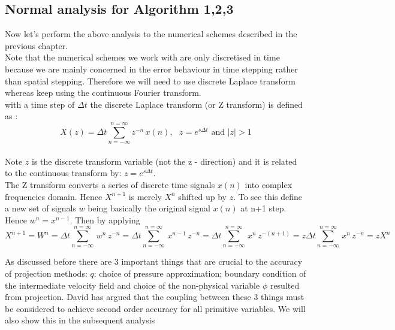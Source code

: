 \subsection{Normal analysis for Algorithm 1,2,3}
Now let's perform the above analysis to the numerical schemes described in the previous chapter. \\
Note that the numerical schemes we work with are only discretised in time because we are mainly concerned in the error behaviour in time stepping rather than spatial stepping. Therefore we will need to use discrete Laplace transform whereas keep using the continuous Fourier transform.\\

with a time step of $\Delta t$ the discrete Laplace transform (or Z transform) is defined as \cite{strikwerda1999accuracy}:
\begin{equation*}
X(z) = \Delta t \sum_{n=-\infty}^{n=\infty} z^{-n} \, x(n), \text{     $z = e^{s \Delta t} $ and $|z| > 1$}
\end{equation*}
\cite{strikwerda1999accuracy, brown2001accurate, pyo2005normal}\\
Note $z$ is the discrete transform variable (not the z - direction) and it is related to the continuous transform by: $z = e^{s \Delta t}$.\\

The Z transform converts a series of discrete time signals $x(n)$ into complex frequencies domain. Hence $X^{n+1}$ is merely $X^n$ shifted up by $z$. To see this define a new set of signals $w$ being basically the original signal $x(n)$ at n+1 step. Hence $w^n = x^{n-1}$. Then by applying 
\begin{dmath}
X^{n+1} = W^n
= \Delta t \sum_{n=-\infty}^{n=\infty}\,w^n\,z^{-n} =  \Delta t \sum_{n=-\infty}^{n=\infty}\,x^{n-1}\,z^{-n} 
=  \Delta t \sum_{n=-\infty}^{n=\infty}\,x^n\,z^{-(n+1)} = z \Delta t \sum_{n=-\infty}^{n=\infty}\,x^n\,z^{-n} 
= z X^n
\end{dmath}

As discussed before there are 3 important things that are crucial to the accuracy of projection methods: $q$: choice of pressure approximation; boundary condition of the intermediate velocity field and choice of the non-physical variable $\phi$ resulted from projection. David has argued that the coupling between these 3 things must be considered to achieve second order accuracy for all primitive variables. We will also show this in the subsequent analysis \cite{brown2001accurate}\\

